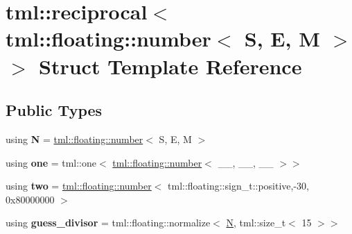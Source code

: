 \hypertarget{structtml_1_1reciprocal_3_01tml_1_1floating_1_1number_3_01S_00_01E_00_01M_01_4_01_4}{\section{tml\+:\+:reciprocal$<$ tml\+:\+:floating\+:\+:number$<$ S, E, M $>$ $>$ Struct Template Reference}
\label{structtml_1_1reciprocal_3_01tml_1_1floating_1_1number_3_01S_00_01E_00_01M_01_4_01_4}
}
\subsection*{Public Types}
\begin{DoxyCompactItemize}
\item 
\hypertarget{structtml_1_1reciprocal_3_01tml_1_1floating_1_1number_3_01S_00_01E_00_01M_01_4_01_4_ad36a3d65efbcc494e1e47971265a870c}{using {\bfseries N} = \hyperlink{structtml_1_1floating_1_1number}{tml\+::floating\+::number}$<$ S, E, M $>$}\label{structtml_1_1reciprocal_3_01tml_1_1floating_1_1number_3_01S_00_01E_00_01M_01_4_01_4_ad36a3d65efbcc494e1e47971265a870c}

\item 
\hypertarget{structtml_1_1reciprocal_3_01tml_1_1floating_1_1number_3_01S_00_01E_00_01M_01_4_01_4_a4c4b6d15a07322bd2aff7c539e42bcee}{using {\bfseries one} = tml\+::one$<$ \hyperlink{structtml_1_1floating_1_1number}{tml\+::floating\+::number}$<$ \+\_\+\+\_\+, \+\_\+\+\_\+, \+\_\+\+\_\+ $>$$>$}\label{structtml_1_1reciprocal_3_01tml_1_1floating_1_1number_3_01S_00_01E_00_01M_01_4_01_4_a4c4b6d15a07322bd2aff7c539e42bcee}

\item 
\hypertarget{structtml_1_1reciprocal_3_01tml_1_1floating_1_1number_3_01S_00_01E_00_01M_01_4_01_4_a3b51f18ae825c70babf4e9fb6cf0e75f}{using {\bfseries two} = \hyperlink{structtml_1_1floating_1_1number}{tml\+::floating\+::number}$<$ tml\+::floating\+::sign\+\_\+t\+::positive,-\/30, 0x80000000 $>$}\label{structtml_1_1reciprocal_3_01tml_1_1floating_1_1number_3_01S_00_01E_00_01M_01_4_01_4_a3b51f18ae825c70babf4e9fb6cf0e75f}

\item 
\hypertarget{structtml_1_1reciprocal_3_01tml_1_1floating_1_1number_3_01S_00_01E_00_01M_01_4_01_4_a58b15d0438fef83616e4f9f16f88b87b}{using {\bfseries guess\+\_\+divisor} = tml\+::floating\+::normalize$<$ \hyperlink{structtml_1_1floating_1_1number}{N}, tml\+::size\+\_\+t$<$ 15 $>$$>$}\label{structtml_1_1reciprocal_3_01tml_1_1floating_1_1number_3_01S_00_01E_00_01M_01_4_01_4_a58b15d0438fef83616e4f9f16f88b87b}


\end{DoxyCompactItemize}
